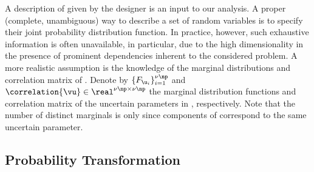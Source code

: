 A description of \vu given by the designer is an input to our analysis. A proper
(complete, unambiguous) way to describe a set of random variables is to specify
their joint probability distribution function. In practice, however, such
exhaustive information is often unavailable, in particular, due to the high
dimensionality in the presence of prominent dependencies inherent to the
considered problem. A more realistic assumption is the knowledge of the marginal
distributions and correlation matrix of \vu. Denote by $\{ F_{\u_i} \}_{i =
1}^{\nu \np}$ and $\correlation{\vu} \in \real^{\nu \np \times \nu \np}$ the
marginal distribution functions and correlation matrix of the uncertain
parameters \vu in , respectively. Note that the
number of distinct marginals is only \nu since \np components of \vu correspond
to the same uncertain parameter.

\subsection{Probability Transformation}

